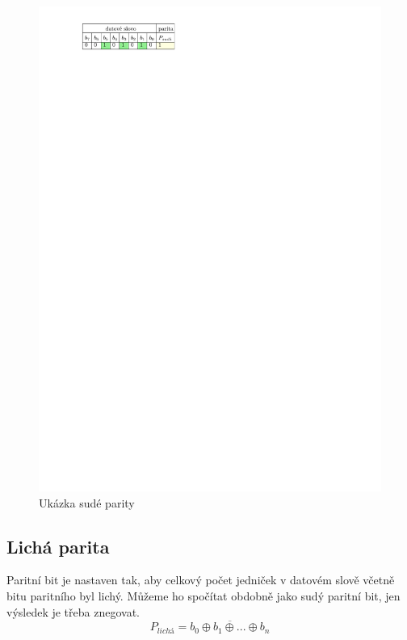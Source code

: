 \begin{figure}[H]
    \begin{center}
        \includegraphics[scale=1]{img/parita_suda}
    \end{center}
    \caption{Ukázka sudé parity}
\end{figure}

\subsection{Lichá parita}
Paritní bit je nastaven tak, aby celkový počet jedniček v datovém slově včetně bitu paritního byl lichý. Můžeme ho spočítat obdobně jako sudý paritní bit, jen výsledek je třeba znegovat.
$$ P_{lichá} = \overline{ b_0 \oplus b_1 \oplus ... \oplus b_n } $$

